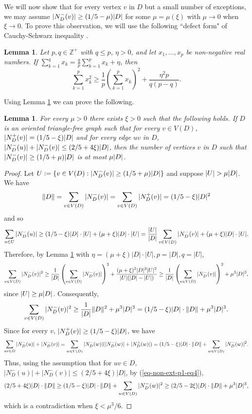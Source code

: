 \documentclass{article}
\newtheorem{lemma}[theorem]{Lemma}
\DeclarePairedDelimiter{\abs}{\lvert}{\rvert}
\begin{document}
We will now show that for every vertex $v$ in $D$  but a small number of exceptions, we may assume $|N^-_D(v)|\geq (1/5-\mu)\abs{D}$ for some $\mu =\mu(\xi)$ with $\mu \rightarrow 0$ when $\xi\rightarrow 0$.
To prove this observation, we will use the following ``defect form" of Cauchy-Schwarz inequality \cite{szem}.
\begin{lemma}\label{CS-ineq}
Let $p,q\in \mathbb{Z}^+$ with $q\leq p$, $\eta>0$, and let $x_1, \dots, x_p$ be non-negative real numbers. If $\sum_{k=1}^qx_k=\frac{q}{p}\sum_{k=1}^px_k+\eta$, then
$$\sum_{k=1}^px_k^2\geq \frac{1}{p}\left(\sum_{k=1}^px_k\right)^2+\frac{\eta^2p}{q(p-q)}.$$
\end{lemma}
Using Lemma \ref{CS-ineq} we can prove the following.
\begin{lemma}\label{lem2-non-ext-part1}
    For every $\mu>0$ there exists $\xi>0$ such that the following holds. If $D$ is an oriented triangle-free graph  such that for every $v\in V(D)$, $|N^+_D(v)|=(1/5-\xi)\abs{D}$ and for every edge $uv$ in $D$, $|N^-_D(u)|+|N^-_D(v)|\leq (2/5+ 4\xi)\abs{D}$, then the number of vertices $v$ in $D$ such that $|N^-_D(v)|\geq (1/5+\mu)\abs{D}$ is at most $\mu \abs{D}$.    
\end{lemma}
\begin{proof}Let $U:= \{v\in V(D) : |N^-_D(v)|\geq (1/5+\mu)\abs{D}\}$ and suppose $|U|> \mu \abs{D}$.
We have
\begin{equation}\label{eq-non-ext-p1-eq3.5}\|D\|=\sum_{v\in V(D)}|N^-_D(v)|=\sum_{v\in V(D)}|N^+_D(v)|=(1/5-\xi)\abs{D}^2\end{equation}
and so
$$\sum_{u\in U}|N^-_D(u)|\geq (1/5-\xi)\abs{D} \cdot |U|+ (\mu+\xi)\abs{D}\cdot |U|=\frac{|U|}{\abs{D}}\sum_{v\in V(D)}|N^-_D(v)|+(\mu+\xi)\abs{D}\cdot |U|.$$
Therefore, by Lemma \ref{CS-ineq} with $\eta=(\mu+\xi)|D|\cdot |U|, p = |D|, q = |U|$,
$$\sum_{v\in V(D)}|N^-_D(v)|^2\geq \frac{1}{\abs{D}}\left(\sum_{v\in V(D)}|N^-_D(v)|\right)^2+ \frac{(\mu+\xi)^2\abs{D}^3|U|^2}{|U|(\abs{D}-|U|)}\geq \frac{1}{|D|}\left(\sum_{v\in V(D)}|N^-_D(v)|\right)^2+\mu^3\abs{D}^3,$$
since $|U|\geq \mu \abs{D}$. Consequently,
\begin{equation}\label{eq-non-ext-p1-eq4}
 \sum_{v\in V(D)}|N^-_D(v)|^2\geq\frac{1}{\abs{D}}\|D\|^2+\mu^3\abs{D}^3= (1/5-\xi)\abs{D}\cdot \|D\|+\mu^3\abs{D}^3.   
\end{equation}
Since for every $v$, $|N^+_D(v)|\geq (1/5-\xi)\abs{D}$, we have
$$\sum_{uv\in D}|N^-_D(u)|+|N^-_D(v)|= \sum_{w\in V(D)}|N^-_D(w)|(|N^-_D(w)|+|N^+_D(w)|)= (1/5-\xi)\abs{D}\cdot \|D\|+ \sum_{w\in V(D)}|N^-_D(w)|^2.$$
Thus, using the assumption that for $uv\in D$, $|N^-_D(u)|+|N^-_D(v)|\leq (2/5+4\xi)|D|$, by (\ref{eq-non-ext-p1-eq4}),
$$(2/5+4\xi)\abs{D} \cdot \|D\|\geq  (1/5-\xi)\abs{D}\cdot\|D\|+ \sum_{w\in V(D)}|N^-_D(w)|^2 \geq (2/5-2\xi)\abs{D}\cdot\|D\|+\mu^3\abs{D}^3,$$
which is a contradiction when $\xi < \mu^3/6.$
\end{proof}
\end{document}
